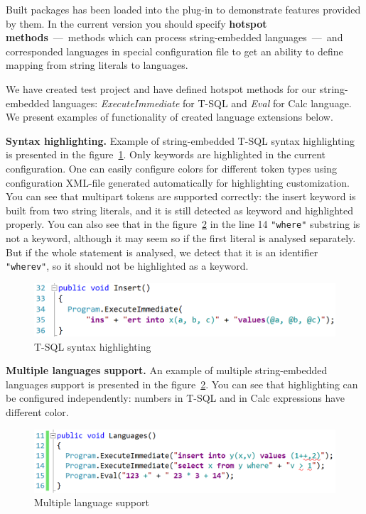 \documentclass{acm_proc_article-sp}
\begin{document}
Built  packages has been loaded into the plug-in to demonstrate features provided by them. In the current version you should specify {\bf hotspot methods}~---~methods which can process string-embedded languages~---~and corresponded languages in special configuration file to get an ability to define mapping from string literals to languages. 

We have created test project and have defined hotspot methods for our string-embedded languages: {\it ExecuteImmediate} for T-SQL and {\it Eval} for Calc language. We present examples of functionality of created language extensions below.

{\bf Syntax highlighting.} Example of string-embedded T-SQL syntax highlighting is presented in the figure~\ref{sqlHighlighting}. Only keywords are highlighted in the current configuration. One can easily configure colors for different token types using configuration XML-file generated automatically for highlighting customization. You can see that multipart tokens are supported correctly: the insert keyword is built from two string literals, and it is still detected as keyword and highlighted properly. You can also see that in the figure~\ref{languages} in the line 14 \verb|"where"| substring is not a keyword, although it may seem so if the first literal is analysed separately. But if the whole statement is analysed, we detect that it is an identifier \verb|"wherev"|, so it should not be highlighted as a keyword.
  

\begin{figure}[h!]
    \begin{center}
        \includegraphics[scale=0.3]{graphics/Insert.png}
    \end{center}
    \caption{T-SQL syntax highlighting}
    \label{sqlHighlighting}
\end{figure}
 
{\bf Multiple languages support.} An example of multiple string-embedded languages support is presented in the figure~\ref{languages}. You can see that highlighting can be configured independently: numbers in T-SQL and in Calc expressions have different color.

\begin{figure}[h!]
    \begin{center}
        \includegraphics[scale=0.3]{graphics/Languages.png}
    \end{center}
    \caption{Multiple language support}
    \label{languages}
\end{figure}
\end{document}
